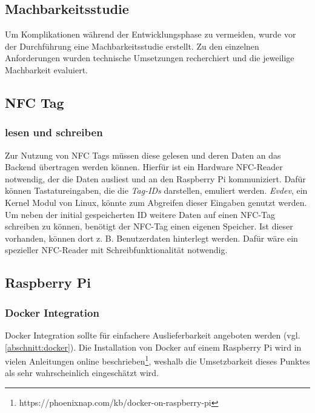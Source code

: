 \documentclass[10pt, a4paper]{article}
\begin{document}
\begin{onehalfspace}
\section{Machbarkeitsstudie}
\label{machbarkeitsstudie}
Um Komplikationen während der Entwicklungsphase zu vermeiden, wurde vor der Durchführung eine Machbarkeitsstudie erstellt.
Zu den einzelnen Anforderungen wurden technische Umsetzungen recherchiert und die jeweilige Machbarkeit evaluiert.

\subsection{NFC Tag}
\subsubsection*{lesen und schreiben}
Zur Nutzung von NFC Tags müssen diese gelesen und deren Daten an das Backend übertragen werden können.
Hierfür ist ein Hardware NFC-Reader notwendig, der die Daten ausliest und an den Raspberry Pi kommuniziert.
Dafür können Tastatureingaben, die die \textit{Tag-IDs} darstellen, emuliert werden.
\textit{Evdev}, ein Kernel Modul von Linux, könnte zum Abgreifen dieser Eingaben genutzt werden.
\\
Um neben der initial gespeicherten ID weitere Daten auf einen NFC-Tag schreiben zu können, benötigt der NFC-Tag einen eigenen Speicher.
Ist dieser vorhanden, können dort z. B. Benutzerdaten hinterlegt werden.
Dafür wäre ein spezieller NFC-Reader mit Schreibfunktionalität notwendig.

\subsection{Raspberry Pi}
\subsubsection*{Docker Integration}
Docker Integration sollte für einfachere Auslieferbarkeit angeboten werden (vgl. \autoref{abschnitt:docker}).
Die Installation von Docker auf einem Raspberry Pi wird in vielen Anleitungen online beschrieben\footnote{https://phoenixnap.com/kb/docker-on-raspberry-pi}, weshalb die Umsetzbarkeit dieses Punktes als sehr wahrscheinlich eingeschätzt wird.


\end{onehalfspace}
\end{document}

